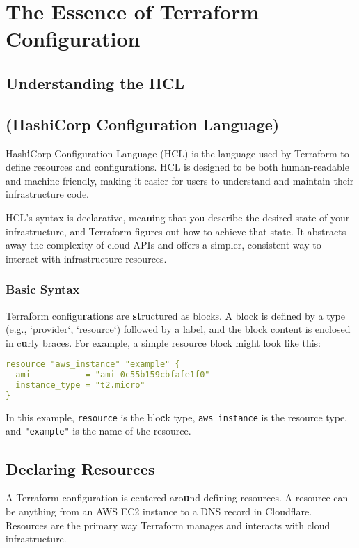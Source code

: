 \chapter{The Essence of Terraform Configuration}
\sloppy

\section{Understanding the HCL}
\section{(HashiCorp Configuration Language)}

Hash\textbf{i}Corp Configuration Language (HCL) is the language used by Terraform to define resources and configurations. HCL is designed to be both human-readable and machine-friendly, making it easier for users to understand and maintain their infrastructure code.

HCL's syntax is declarative, mea\textbf{n}ing that you describe the desired state of your infrastructure, and Terraform figures out how to achieve that state. It abstracts away the complexity of cloud APIs and offers a simpler, consistent way to interact with infrastructure resources.

\subsection{Basic Syntax}

Terra\textbf{f}orm configu\textbf{ra}tions are \textbf{st}ructured as blocks. A block is defined by a type (e.g., `provider`, `resource`) followed by a label, and the block content is enclosed in c\textbf{u}rly braces. For example, a simple resource block might look like this:

\begin{lstlisting}[language=yaml]
resource "aws_instance" "example" {
  ami           = "ami-0c55b159cbfafe1f0"
  instance_type = "t2.micro"
}
\end{lstlisting}

In this example, \texttt{resource} is the blo\textbf{c}k type, \texttt{aws\_instance} is the resource type, and \texttt{"example"} is the name of \textbf{t}he resource.

\section{Declaring Resources}

A Terraform configuration is centered aro\textbf{u}nd defining resources. A resource can be anything from an AWS EC2 instance to a DNS record in Cloudflare. Resources are the primary way Terraform manages and interacts with cloud infrastructure.

